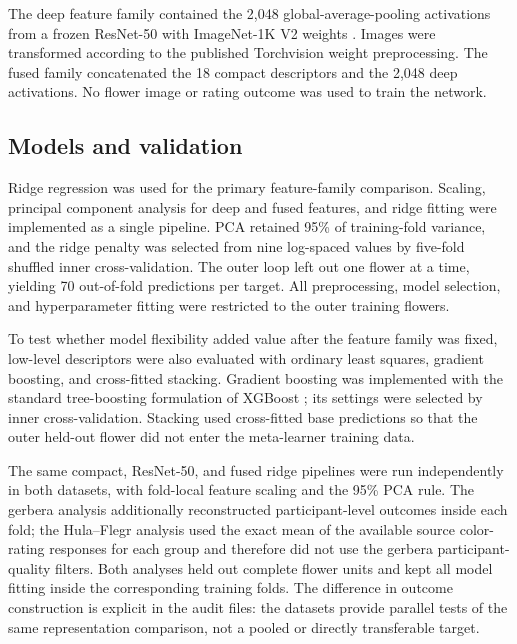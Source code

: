 \documentclass[10pt,letterpaper]{article}
\begin{document}
The deep feature family contained the 2,048 global-average-pooling activations from a frozen ResNet-50 with ImageNet-1K V2 weights \cite{he2016}. Images were transformed according to the published Torchvision weight preprocessing. The fused family concatenated the 18 compact descriptors and the 2,048 deep activations. No flower image or rating outcome was used to train the network.

\subsection*{Models and validation}
Ridge regression was used for the primary feature-family comparison. Scaling, principal component analysis for deep and fused features, and ridge fitting were implemented as a single pipeline. PCA retained 95\% of training-fold variance, and the ridge penalty was selected from nine log-spaced values by five-fold shuffled inner cross-validation. The outer loop left out one flower at a time, yielding 70 out-of-fold predictions per target. All preprocessing, model selection, and hyperparameter fitting were restricted to the outer training flowers.

To test whether model flexibility added value after the feature family was fixed, low-level descriptors were also evaluated with ordinary least squares, gradient boosting, and cross-fitted stacking. Gradient boosting was implemented with the standard tree-boosting formulation of XGBoost \cite{chen2016}; its settings were selected by inner cross-validation. Stacking used cross-fitted base predictions so that the outer held-out flower did not enter the meta-learner training data.

The same compact, ResNet-50, and fused ridge pipelines were run independently in both datasets, with fold-local feature scaling and the 95\% PCA rule. The gerbera analysis additionally reconstructed participant-level outcomes inside each fold; the Hula--Flegr analysis used the exact mean of the available source color-rating responses for each group and therefore did not use the gerbera participant-quality filters. Both analyses held out complete flower units and kept all model fitting inside the corresponding training folds. The difference in outcome construction is explicit in the audit files: the datasets provide parallel tests of the same representation comparison, not a pooled or directly transferable target.
\end{document}
